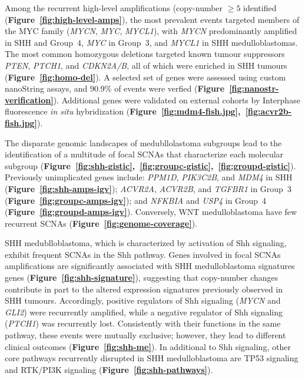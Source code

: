 \documentclass[11pt,letterpaper]{article}
\theoremstyle{definition}
\begin{document}
Among the recurrent high-level amplifications (copy-number $\geq 5$ identified (\textbf{Figure~\ref{fig:high-level-amps}}), the most prevalent events targeted members of the MYC family (\emph{MYCN}, \emph{MYC}, \emph{MYCL1}), with \emph{MYCN} predominantly amplified in SHH and Group~4, \emph{MYC} in Group~3, and \emph{MYCL1} in SHH medulloblastomas.
The most common homozygous deletions targeted known tumour suppressors \emph{PTEN}, \emph{PTCH1}, and \emph{CDKN2A/B}, all of which were enriched in SHH tumours (\textbf{Figure~\ref{fig:homo-del}}). A selected set of genes were assessed using custom nanoString assays, and 90.9\% of events were verfied (\textbf{Figure~\ref{fig:nanostr-verification}}). Additional genes were validated on external cohorts by Interphase fluorescence \emph{in situ} hybridization (\textbf{Figure~\ref{fig:mdm4-fish.jpg},~\ref{fig:acvr2b-fish.jpg}}).

The disparate genomic landscapes of medubllolastoma subgroups lead to the identification of a multitude of focal SCNAs that characterize each molecular subgroup (\textbf{Figure~\ref{fig:shh-gistic},~\ref{fig:groupc-gistic},~\ref{fig:groupd-gistic}}). Previously unimplicated genes include: \emph{PPM1D}, \emph{PIK3C2B}, and \emph{MDM4} in SHH (\textbf{Figure~\ref{fig:shh-amps-igv}}); \emph{ACVR2A}, \emph{ACVR2B}, and \emph{TGFBR1} in Group~3 (\textbf{Figure~\ref{fig:groupc-amps-igv}}); and \emph{NFKBIA} and \emph{USP4} in Group~4 (\textbf{Figure~\ref{fig:groupd-amps-igv}}). Conversely, WNT medulloblastoma have few recurrent SCNAs (\textbf{Figure~\ref{fig:genome-coverage}}). 

SHH medublloblastoma, which is characterized by activation of Shh signaling, exhibit frequent SCNAs in the Shh pathway. Genes involved in focal SCNAs amplifications are significantly associated with SHH medulloblastoma signatures genes (\textbf{Figure~\ref{fig:shh-signature}}), suggesting that copy-number changes contribute in part to the altered expression signatures previously observed in SHH tumours. Accordingly, positive regulators of Shh signaling (\emph{MYCN} and \emph{GLI2}) were recurrently amplified, while a negative regulator of Shh signaling (\emph{PTCH1}) was recurrently lost. Consistently with their functions in the same pathway, these events were mutually exclusive; however, they lead to different clinical outcomes (\textbf{Figure~\ref{fig:shh-me}}). In additional to Shh signaling, other core pathways recurrently disrupted in SHH medulloblastoma are TP53 signaling and RTK/PI3K signaling (\textbf{Figure~\ref{fig:shh-pathways}}).
\end{document}
